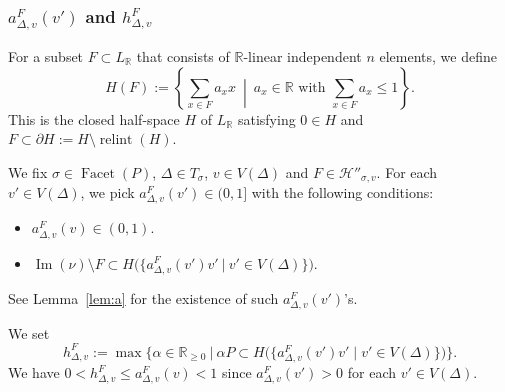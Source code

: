 \documentclass[11pt]{article}
\theoremstyle{definition}
\numberwithin{equation}{section}
\begin{document}
\subsubsection{$a^{F} _{\Delta, v} (v')$ and $h^F_{\Delta, v}$}\label{subsubsection:ah}
\begin{defn}\label{defi:ah}
For a subset $F \subset L_{\mathbb{R}}$ that consists of $\mathbb{R}$-linear independent $n$ elements, 
we define 
\[
H(F) := \left \{ \sum _{x \in F} a_x x \ \middle | \ \text{$a_x \in \mathbb{R}$ with $\sum_{x \in F} a_x \le 1$} \right \}. 
\]
This is the closed half-space $H$ of $L_{\mathbb{R}}$ satisfying $0 \in H$ and $F \subset \partial H := H \setminus \operatorname{relint}(H)$. 
\end{defn}

We fix $\sigma \in \operatorname{Facet}(P)$, $\Delta \in T_{\sigma}$, $v \in V(\Delta)$ and $F \in \mathcal{H}'' _{\sigma, v}$. 
For each $v' \in V(\Delta)$, 
we pick $a^{F} _{\Delta, v} (v') \in (0,1]$ with the following conditions: 
\begin{itemize}
\item[(A1)] 
$a^{F} _{\Delta, v} (v) \in (0,1)$. 

\item[(A2)]
$\operatorname{Im}(\nu) \setminus F \subset H \bigl( \bigl \{ a^{F} _{\Delta, v} (v') v' \ \big | \  v' \in V(\Delta) \bigr \} \bigr)$. 
\end{itemize}
See Lemma~\ref{lem:a} for the existence of such $a^{F} _{\Delta, v} (v')$'s. 

We set
\[\tag{H}
h^F_{\Delta, v} := \max \bigl \{ \alpha \in \mathbb{R}_{\ge 0} \ \big | \ 
\alpha P \subset 
H \bigl( \bigl \{ a^{F} _{\Delta, v} (v') v' \mid v' \in V(\Delta) \bigr \} \bigr) \bigr \}. 
\]
We have $0 < h^F_{\Delta, v} \le a^{F} _{\Delta, v} (v) < 1$ since $a^{F} _{\Delta, v} (v') > 0$ for each $v' \in V(\Delta)$. 
\end{document}
